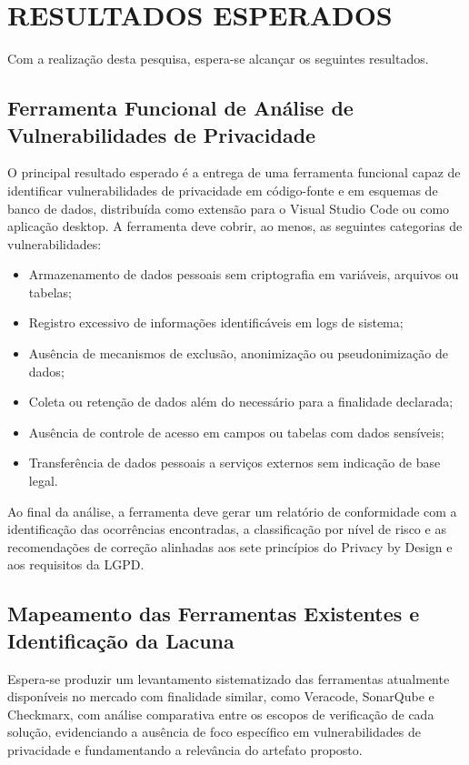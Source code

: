 \documentclass[oneside]{normas-utf-tex}
\begin{document}
\chapter{RESULTADOS ESPERADOS}

Com a realização desta pesquisa, espera-se alcançar os seguintes resultados.

\section{Ferramenta Funcional de Análise de Vulnerabilidades de Privacidade}

O principal resultado esperado é a entrega de uma ferramenta funcional capaz de identificar vulnerabilidades de privacidade em código-fonte e em esquemas de banco de dados, distribuída como extensão para o Visual Studio Code ou como aplicação desktop. A ferramenta deve cobrir, ao menos, as seguintes categorias de vulnerabilidades:

\begin{itemize}
\item Armazenamento de dados pessoais sem criptografia em variáveis, arquivos ou tabelas;
\item Registro excessivo de informações identificáveis em logs de sistema;
\item Ausência de mecanismos de exclusão, anonimização ou pseudonimização de dados;
\item Coleta ou retenção de dados além do necessário para a finalidade declarada;
\item Ausência de controle de acesso em campos ou tabelas com dados sensíveis;
\item Transferência de dados pessoais a serviços externos sem indicação de base legal.
\end{itemize}

Ao final da análise, a ferramenta deve gerar um relatório de conformidade com a identificação das ocorrências encontradas, a classificação por nível de risco e as recomendações de correção alinhadas aos sete princípios do Privacy by Design e aos requisitos da LGPD.

\section{Mapeamento das Ferramentas Existentes e Identificação da Lacuna}

Espera-se produzir um levantamento sistematizado das ferramentas atualmente disponíveis no mercado com finalidade similar, como Veracode, SonarQube e Checkmarx, com análise comparativa entre os escopos de verificação de cada solução, evidenciando a ausência de foco específico em vulnerabilidades de privacidade e fundamentando a relevância do artefato proposto.
\end{document}
